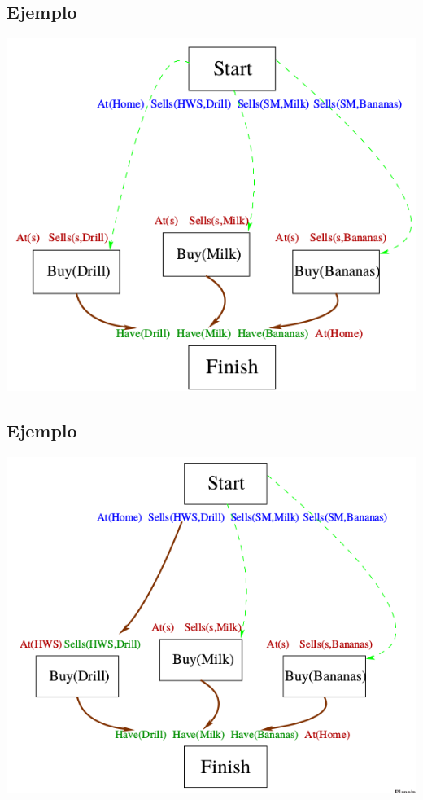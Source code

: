 \documentclass[11pt]{article}
\begin{document}
\subsection*{Ejemplo}
\label{sec:org97ebd84}

\begin{center}
\includegraphics[width=.9\linewidth]{imagenes/pop5.png}
\end{center}

\subsection*{Ejemplo}
\label{sec:orgb4dad5c}

\begin{center}
\includegraphics[width=.9\linewidth]{imagenes/pop6.png}
\end{center}
\end{document}

